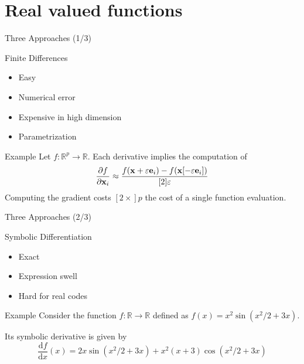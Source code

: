 \documentclass[12pt,xcolor={table}]{beamer}
\newcommand{\ebf}{{\bf e}}
\newcommand{\xbf}{{\bf x}}
\def\Rbb{{\mathbb R}}
\newcommand{\dif}[1]{\mathrm{d} #1}
\begin{document}
\section{Real valued functions}

\begin{frame}{Three Approaches (1/3)}

\begin{block}{Finite Differences}
\begin{itemize}
\item Easy
\item Numerical error
\item Expensive in high dimension
\item Parametrization
\end{itemize}
\end{block}

\begin{block}{Example}
Let $f: \Rbb^p \to \Rbb$. Each derivative implies the computation of 
\begin{equation*}
\frac{\partial f}{\partial \xbf_i} \approx \frac{f(\xbf + \varepsilon \ebf_i) - f(\xbf [- \varepsilon \ebf_i])}{[2]\varepsilon}
\end{equation*}	
Computing the gradient costs $[2 \times] p$ the cost of a single function evaluation.
\end{block}

\end{frame}

\begin{frame}{Three Approaches (2/3)}
\begin{block}{Symbolic Differentiation}
\begin{itemize}
\item Exact
\item Expression swell
\item Hard for real codes
\end{itemize}
\end{block}

\begin{block}{Example}
Consider the function 
$f: \Rbb \to \Rbb$ defined as $f(x) = x^2\sin(x^2/2 + 3x)$. 

Its symbolic derivative is given by 
\[
\frac{\dif{f}}{\dif x} (x) = 2x\sin(x^2/2+3x) + x^2(x+3)\cos(x^2/2+3x)
\]
\end{block}

\end{frame}
\end{document}
